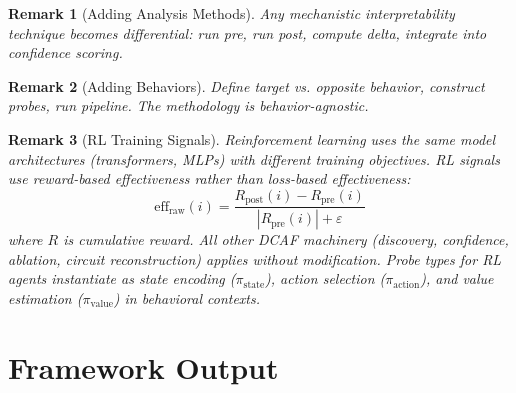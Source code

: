 \documentclass[11pt]{article}
\newtheorem{remark}{Remark}[section]
\begin{document}
\begin{remark}[Adding Analysis Methods]
\label{rem:adding-analysis-methods}
Any mechanistic interpretability technique becomes differential: run pre, run post, compute delta, integrate into confidence scoring.
\end{remark}

\begin{remark}[Adding Behaviors]
\label{rem:adding-behaviors}
Define target vs. opposite behavior, construct probes, run pipeline. The methodology is behavior-agnostic.
\end{remark}

\begin{remark}[RL Training Signals]
\label{rem:rl-training-signals}
Reinforcement learning uses the same model architectures (transformers, MLPs) with different training objectives. RL signals use reward-based effectiveness rather than loss-based effectiveness:
\begin{equation}
\text{eff}_{\text{raw}}(i) = \frac{R_{\text{post}}(i) - R_{\text{pre}}(i)}{|R_{\text{pre}}(i)| + \varepsilon}
\end{equation}
where $R$ is cumulative reward. All other DCAF machinery (discovery, confidence, ablation, circuit reconstruction) applies without modification. Probe types for RL agents instantiate as state encoding ($\pi_{\text{state}}$), action selection ($\pi_{\text{action}}$), and value estimation ($\pi_{\text{value}}$) in behavioral contexts.
\end{remark}

\section{Framework Output}
\label{app:output}
\end{document}

